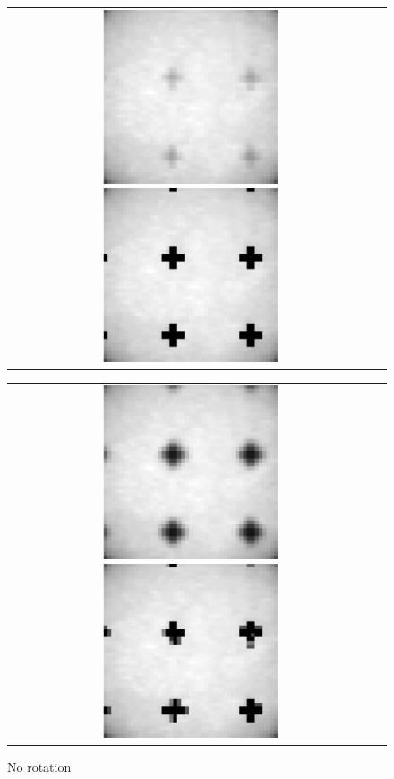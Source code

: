 \documentclass[iop]{emulateapj}
\begin{document}
\begin{figure}
        \begin{tabular}{cc}
            \includegraphics[width=0.5\textwidth]{rot_0_1}
            \includegraphics[width=0.5\textwidth]{rot_0_2}
        \end{tabular}
        \begin{tabular}{cc}
            \includegraphics[width=0.5\textwidth]{rot_0_3}
            \includegraphics[width=0.5\textwidth]{rot_0_4}
        \end{tabular}
        \caption{No rotation}
\end{figure}
\end{document}
